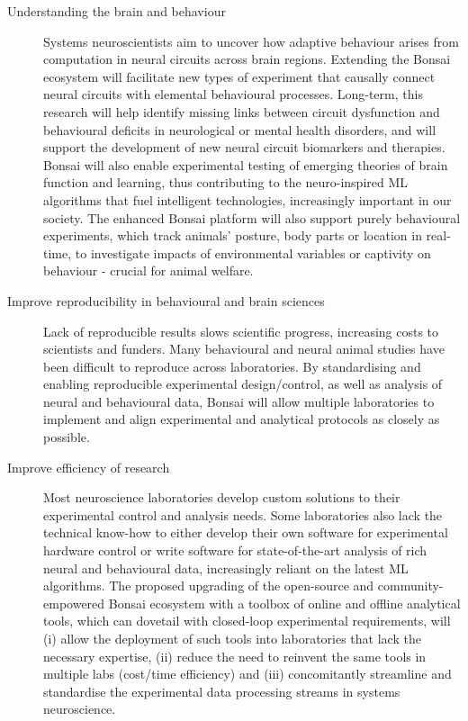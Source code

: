 \documentclass[a4paper,11pt]{article}
\begin{document}
\begin{description}

    \item[Understanding the brain and behaviour] Systems neuroscientists aim to
        uncover how adaptive behaviour arises from computation in neural
        circuits across brain regions. Extending the Bonsai ecosystem
        will facilitate new types of experiment that causally connect neural
        circuits with elemental behavioural processes. Long-term, this research
        will help identify missing links between circuit dysfunction and
        behavioural deficits in neurological or mental health disorders, and
        will support the development of new neural circuit biomarkers
        and therapies. Bonsai will also enable experimental
        testing of emerging theories of brain function and learning, thus
        contributing to the neuro-inspired ML algorithms that fuel
        intelligent technologies, increasingly important in our society.  The
        enhanced Bonsai platform will also support purely behavioural
        experiments, which track animals' posture, body parts or location in real-time, to investigate impacts of environmental variables
        or captivity on behaviour - crucial for
        animal welfare.   

    \item[Improve reproducibility in behavioural and brain sciences] Lack of
        reproducible results slows scientific progress, increasing costs to scientists and funders.  Many
        behavioural and neural animal studies have been difficult to
        reproduce across laboratories.
        By standardising and enabling reproducible
        experimental design/control, as well as analysis of neural and
        behavioural data, Bonsai will allow multiple laboratories
        to implement and align experimental and analytical protocols as closely
        as possible.

    \item[Improve efficiency of research] Most neuroscience laboratories
        develop custom solutions to their experimental
        control and analysis needs. Some laboratories also lack the technical
        know-how to either develop their own software for experimental hardware
        control or write software for state-of-the-art analysis of rich
        neural and behavioural data, increasingly reliant on the latest ML algorithms. The proposed upgrading of the open-source and
        community-empowered Bonsai ecosystem with a toolbox of online and
        offline analytical tools, which can dovetail with closed-loop
        experimental requirements, will (i) allow the deployment of such tools
        into laboratories that lack the necessary expertise, (ii) reduce the need to
        reinvent the same tools in multiple labs (cost/time efficiency) and
        (iii) concomitantly streamline and standardise the experimental data
        processing streams in systems neuroscience.

\end{description}
\end{document}
